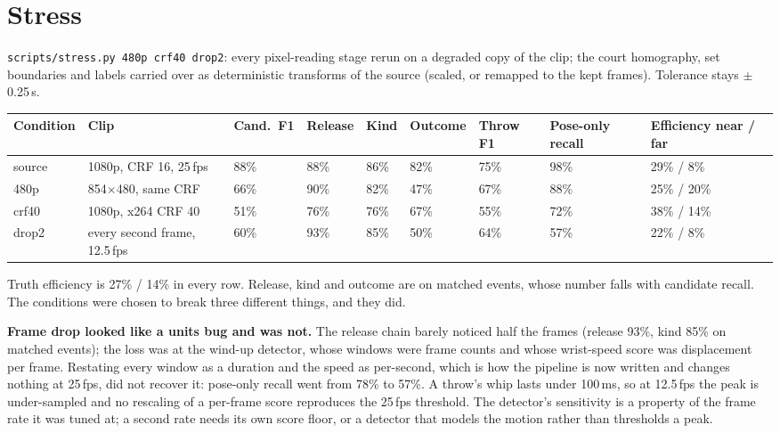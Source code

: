\documentclass[10pt,a4paper]{article}
\begin{document}
\section{Stress}
\label{sec:stress}

\texttt{scripts/stress.py 480p crf40 drop2}: every pixel-reading stage rerun on a degraded
copy of the clip; the court homography, set boundaries and labels carried over as
deterministic transforms of the source (scaled, or remapped to the kept frames). Tolerance
stays $\pm$0.25\,s.

{\footnotesize
\begin{xltabular}{\textwidth}{L{14mm} L{30mm} R{11mm} R{11mm} R{9mm} R{12mm} R{11mm} R{13mm} L{22mm}}
\toprule
\textbf{Condition} & \textbf{Clip} & \textbf{Cand.\ F1} & \textbf{Release} & \textbf{Kind} & \textbf{Outcome} & \textbf{Throw F1} & \textbf{Pose-only recall} & \textbf{Efficiency near / far}\\
\midrule
source & 1080p, CRF 16, 25\,fps & 88\% & 88\% & 86\% & 82\% & 75\% & 98\% & 29\% / 8\%\\
480p & 854$\times$480, same CRF & 66\% & 90\% & 82\% & 47\% & 67\% & 88\% & 25\% / 20\%\\
crf40 & 1080p, x264 CRF 40 & 51\% & 76\% & 76\% & 67\% & 55\% & 72\% & 38\% / 14\%\\
drop2 & every second frame, 12.5\,fps & 60\% & 93\% & 85\% & 50\% & 64\% & 57\% & 22\% / 8\%\\
\bottomrule
\end{xltabular}}

Truth efficiency is 27\% / 14\% in every row. Release, kind and outcome are on matched
events, whose number falls with candidate recall. The conditions were chosen to break three
different things, and they did.

\textbf{Frame drop looked like a units bug and was not.} The release chain barely noticed
half the frames (release 93\%, kind 85\% on matched events); the loss was at the wind-up
detector, whose windows were frame counts and whose wrist-speed score was displacement per
frame. Restating every window as a duration and the speed as per-second, which is how the
pipeline is now written and changes nothing at 25\,fps, did not recover it: pose-only recall
went from 78\% to 57\%. A throw's whip lasts under 100\,ms, so at 12.5\,fps the peak is
under-sampled and no rescaling of a per-frame score reproduces the 25\,fps threshold. The
detector's sensitivity is a property of the frame rate it was tuned at; a second rate needs
its own score floor, or a detector that models the motion rather than thresholds a peak.
\end{document}
